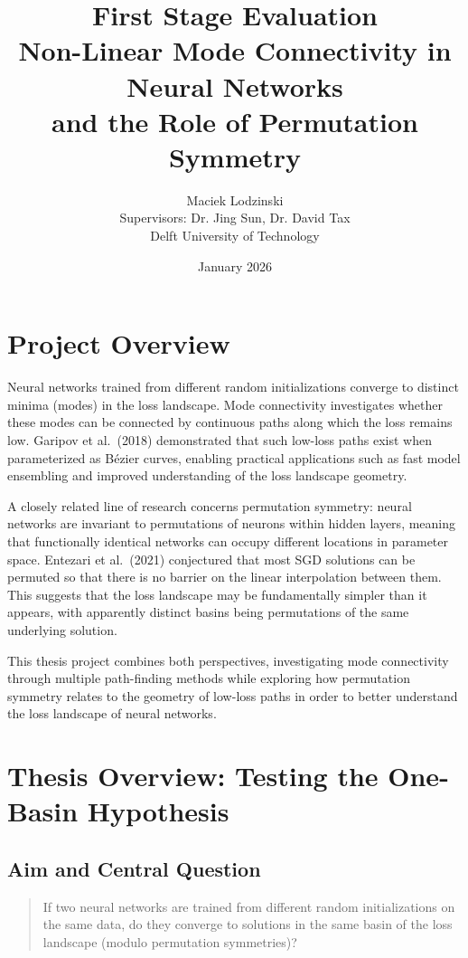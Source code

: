 \documentclass[11pt,a4paper]{article}
\title{First Stage Evaluation\\[0.3cm]
\large Non-Linear Mode Connectivity in Neural Networks\\and the Role of Permutation Symmetry}
\author{Maciek Lodzinski\\[0.2cm]
\small Supervisors: Dr. Jing Sun, Dr. David Tax\\
\small Delft University of Technology}
\date{January 2026}
\begin{document}
\maketitle

\tableofcontents
\newpage

\section{Project Overview}

Neural networks trained from different random initializations converge to distinct minima (modes) in the loss landscape. Mode connectivity investigates whether these modes can be connected by continuous paths along which the loss remains low. Garipov et al.\ (2018) demonstrated that such low-loss paths exist when parameterized as B\'{e}zier curves, enabling practical applications such as fast model ensembling and improved understanding of the loss landscape geometry.

A closely related line of research concerns permutation symmetry: neural networks are invariant to permutations of neurons within hidden layers, meaning that functionally identical networks can occupy different locations in parameter space. Entezari et al.\ (2021) conjectured that most SGD solutions can be permuted so that there is no barrier on the linear interpolation between them. This suggests that the loss landscape may be fundamentally simpler than it appears, with apparently distinct basins being permutations of the same underlying solution.

This thesis project combines both perspectives, investigating mode connectivity through multiple path-finding methods while exploring how permutation symmetry relates to the geometry of low-loss paths in order to better understand the loss landscape of neural networks.

\section{Thesis Overview: Testing the One-Basin Hypothesis}

\subsection{Aim and Central Question}

\begin{quote}
If two neural networks are trained from different random initializations on the same data, do they converge to solutions in the same basin of the loss landscape (modulo permutation symmetries)?
\end{quote}
\end{document}
